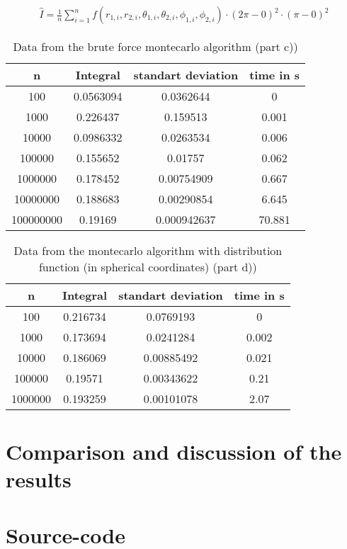 \documentclass[10pt,a4paper]{article}
\begin{document}
\begin{align}
\hat{I}= \frac{1}{n} \sum_{i=1}^{n} f( r_{1,i}, r_{2,i}, \theta_{1,i}, \theta_{2,i}, \phi_{1,i}, \phi_{2,i}) \cdot (2 \pi - 0)^2 \cdot (\pi -0)^2  \label{integralinourcase}
\end{align}

\begin{table}[h]
\centering
\caption{Data from the brute force montecarlo algorithm (part c))}
\label{Data from the brute force montecarlo algorithm (part c))}
\begin{tabular}{c|c|c|c}
n & Integral & standart deviation & time in s \\
\hline\hline
100 & 0.0563094 & 0.0362644 & 0 \\
1000 & 0.226437 & 0.159513 & 0.001 \\
10000 & 0.0986332 & 0.0263534 & 0.006 \\
100000 & 0.155652 & 0.01757 & 0.062 \\
1000000 & 0.178452 & 0.00754909 & 0.667 \\
10000000 & 0.188683 & 0.00290854 & 6.645 \\
100000000 & 0.19169 & 0.000942637 & 70.881 
\end{tabular}
\end{table}

\begin{table}[h]
\centering
\caption{Data from the montecarlo algorithm with distribution function (in spherical coordinates) (part d))}
\label{Data from the  montecarlo algorithm (part d))}
\begin{tabular}{c|c|c|c}
n & Integral & standart deviation & time in s \\
\hline\hline
100 & 0.216734 & 0.0769193 & 0 \\
1000 & 0.173694 & 0.0241284 & 0.002 \\
10000 & 0.186069 & 0.00885492 & 0.021 \\
100000 & 0.19571 & 0.00343622 & 0.21 \\
1000000 & 0.193259 & 0.00101078 & 2.07 
\end{tabular}
\end{table}

\section{Comparison and discussion of the results}

\section{Source-code}
\end{document}
